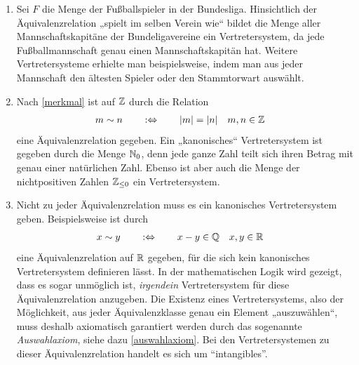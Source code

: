 \begin{bsp}[*] \quad
    \begin{enumerate}
        \item Sei $F$ die Menge der Fußballspieler in der Bundesliga. Hinsichtlich der Äquivalenzrelation „spielt im selben Verein wie“ bildet die Menge aller Mannschaftskapitäne der Bundeligavereine ein Vertretersystem, da jede Fußballmannschaft genau einen Mannschaftskapitän hat. Weitere Vertretersysteme erhielte man beispielsweise, indem man aus jeder Mannschaft den ältesten Spieler oder den Stammtorwart auswählt.
        \item Nach \cref{merkmal} ist auf $\mathbb Z$ durch die Relation
        \begin{align*}
            m\sim n\qquad&:\Leftrightarrow\qquad \vert m\vert=\vert n\vert && m,n\in \mathbb Z
        \end{align*}
        eine Äquivalenzrelation gegeben. Ein „kanonisches“ Vertretersystem ist gegeben durch die Menge $\mathbb N_0$, denn jede ganze Zahl teilt sich ihren Betrag mit genau einer natürlichen Zahl. Ebenso ist aber auch die Menge der nichtpositiven Zahlen $\mathbb Z_{\le 0}$ ein Vertretersystem.
        \item Nicht zu jeder Äquivalenzrelation muss es ein kanonisches Vertretersystem geben. Beispielsweise ist durch
        \begin{align*}
            x\sim y \qquad&:\Leftrightarrow\qquad x-y\in \mathbb Q && x,y\in \mathbb R
        \end{align*}
        eine Äquivalenzrelation auf $\mathbb R$ gegeben, für die sich kein kanonisches Vertretersystem definieren lässt. In der mathematischen Logik wird gezeigt, dass es sogar unmöglich ist, \emph{irgendein} Vertretersystem für diese Äquivalenzrelation anzugeben. Die Existenz eines Vertretersystems, also der Möglichkeit, aus jeder Äquivalenzklasse genau ein Element „auszuwählen“, muss deshalb axiomatisch garantiert werden durch das sogenannte \emph{Auswahlaxiom}, siehe dazu \cref{auswahlaxiom}. Bei den Vertretersystemen zu dieser Äquivalenzrelation handelt es sich um ``intangibles''.
    \end{enumerate}
\end{bsp}






